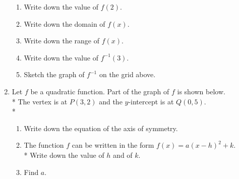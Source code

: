 \documentclass[12pt, oneside]{article}
\begin{document}
\begin{enumerate}
\begin{center}
\begin{tikzpicture}

    \end{tikzpicture}
    \end{center}
  \begin{enumerate}
      \item Write down the value of $f(2)$.
      \item Write down the domain of $f(x)$.
      \item Write down the range of $f(x)$.
      \item Write down the value of $f^{-1}(3)$.
      \item Sketch the graph of $f^{-1}$ on the grid above.
  \end{enumerate}

\item Let $f$ be a quadratic function. Part of the graph of $f$ is shown below.\\*
The vertex is at $P(3,2)$ and the $y$-intercept is at $Q(0, 5)$.\\*

  \begin{center}
  \end{center}
  \begin{enumerate}
      \item Write down the equation of the axis of symmetry.
      \item The function $f$ can be written in the form $f(x)=a(x-h)^2 +k$. \\*
      Write down the value of $h$ and of $k$.
      \item Find $a$.
  \end{enumerate}


\end{enumerate}
\end{document}
